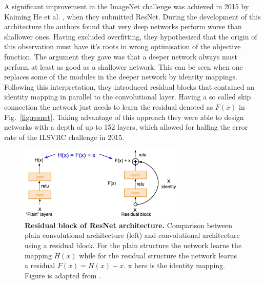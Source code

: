 A significant improvement in the ImageNet challenge was achieved in 2015 by Kaiming He et al. \parencite{he2015}, when they submitted ResNet. During the development of this architecture the authors found that very deep networks perform worse than shallower ones. Having excluded overfitting, they hypothesized that the origin of this observation must have it's roots in wrong optimisation of the objective function. The argument they gave was that a deeper network always must perform at least as good as a shallower network. This can be seen when one replaces some of the modules in the deeper network by identity mappings. Following this interpretation, they introduced residual blocks that contained an identity mapping in parallel to the convolutional layer. Having a so called skip connection the network just needs to learn the residual denoted as $F(x)$ in Fig.~\ref{fig:resnet}. Taking advantage of this approach they were able to design networks with a depth of up to 152 layers, which allowed for halfing the error rate of the ILSVRC challenge in 2015. 

\begin{figure}[h!]
	\centering
	\captionsetup{width=1\linewidth}
	\includegraphics[width=0.7\textwidth]{Figures/residual_modul.png}
	\caption{\textbf{Residual block of ResNet architecture.} Comparison between plain convolutional architecture (left) and convolutional architecture using a residual block. For the plain structure the network learns the mapping $H(x)$ while for the residual structure the network learns a residual $F(x) = H(x) - x$. x here is the identity mapping. Figure is adapted from \parencite{cs231}.}
	\label{fig:residual}
\end{figure}

